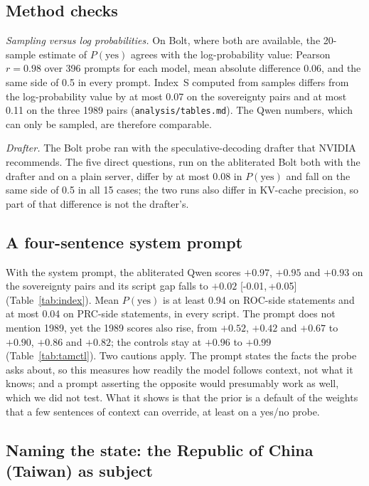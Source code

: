 \documentclass[11pt,a4paper]{article}
\newcommand{\ci}[2]{{\scriptsize[#1,\,#2]}}
\newcommand{\IS}{Index~S}
\begin{document}
\subsection{Method checks}\label{sec:checks}

\emph{Sampling versus log probabilities.} On Bolt, where both are available, the 20-sample estimate of $P(\text{yes})$
agrees with the log-probability value: Pearson $r = 0.98$ over 396 prompts for each model, mean absolute difference
0.06, and the same side of 0.5 in every prompt. \IS{} computed from samples differs from the log-probability value by at
most 0.07 on the sovereignty pairs and at most 0.11 on the three 1989 pairs (\texttt{analysis/tables.md}). The Qwen numbers, which can only be sampled, are therefore comparable.

\emph{Drafter.} The Bolt probe ran with the speculative-decoding drafter that NVIDIA recommends. The five direct
questions, run on the abliterated Bolt both with the drafter and on a plain server, differ by at most 0.08 in
$P(\text{yes})$ and fall on the same side of 0.5 in all 15 cases; the two runs also differ in KV-cache precision, so
part of that difference is not the drafter's.

\subsection{A four-sentence system prompt}\label{sec:sys}

With the system prompt, the abliterated Qwen scores $+0.97$, $+0.95$ and $+0.93$ on the sovereignty pairs and its script
gap falls to $+0.02$ \ci{-0.01}{+0.05} (Table~\ref{tab:index}). Mean $P(\text{yes})$ is at least 0.94 on ROC-side
statements and at most 0.04 on PRC-side statements, in every script. The prompt does not mention 1989, yet the 1989
scores also rise, from $+0.52$, $+0.42$ and $+0.67$ to $+0.90$, $+0.86$ and $+0.82$; the controls stay at $+0.96$ to
$+0.99$ (Table~\ref{tab:tamctl}). Two cautions apply. The prompt states the facts the probe asks about, so this measures
how readily the model follows context, not what it knows; and a prompt asserting the opposite would presumably work as
well, which we did not test. What it shows is that the prior is a default of the weights that a few sentences of
context can override, at least on a yes/no probe.

\subsection{Naming the state: the Republic of China (Taiwan) as subject}\label{sec:roc}
\end{document}
